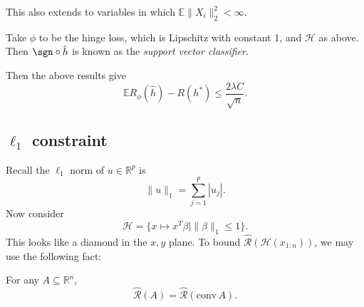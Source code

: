 \documentclass[12pt]{article}
\begin{document}
This also extends to variables in which $\mathbb{E} \|X_i\|_2^2 < \infty$.

\begin{exbox}
	Take $\phi$ to be the hinge loss, which is Lipschitz with constant 1, and $\mathcal{H}$ as above. Then $\sgn \circ \hat h$ is known as the \emph{support vector classifier}.

	Then the above results give
	\[
	\mathbb{E} R_\phi (\hat h) - R(h^\ast) \leq \frac{2\lambda C}{\sqrt n}.
	\]
\end{exbox}

\subsection{\texorpdfstring{$\ell_1$}{l\_1} constraint}
\label{sub:l1_con}

Recall the $\ell_1$ norm of $u \in \mathbb{R}^p$ is
\[
\|u\|_1 = \sum_{j = 1}^p |u_j|.
\]
Now consider
\[
	\mathcal{H} = \{x \mapsto x^T \beta \mid \|\beta\|_1 \leq 1\}.
\]
This looks like a diamond in the $x,y$ plane. To bound $\mathcal{\hat R}(\mathcal{H}(x_{1:n}))$, we may use the following fact:

\begin{lemma}
	For any $A \subseteq \mathbb{R}^n$,
	\[
	\mathcal{\hat R}(A) = \mathcal{\hat R}(\mathrm{conv} \, A).
	\]
\end{lemma}
\end{document}
